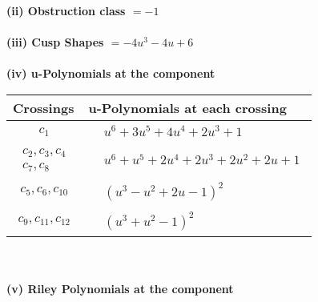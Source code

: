 \documentclass[1p]{elsarticle_modified}
\theoremstyle{definition}
\begin{document}
\flushleft \textbf{(ii) Obstruction class $= -1$}\\~\\
\flushleft \textbf{(iii) Cusp Shapes $= -4 u^3-4 u+6$}\\~\\
\newpage\renewcommand{\arraystretch}{1}
\flushleft \textbf{(iv) u-Polynomials at the component}\newline \\
\begin{tabular}{m{50pt}|m{274pt}}
Crossings & \hspace{64pt}u-Polynomials at each crossing \\
\hline $$\begin{aligned}c_{1}\end{aligned}$$&$\begin{aligned}
&u^6+3 u^5+4 u^4+2 u^3+1
\end{aligned}$\\
\hline $$\begin{aligned}c_{2},c_{3},c_{4}\\c_{7},c_{8}\end{aligned}$$&$\begin{aligned}
&u^6+u^5+2 u^4+2 u^3+2 u^2+2 u+1
\end{aligned}$\\
\hline $$\begin{aligned}c_{5},c_{6},c_{10}\end{aligned}$$&$\begin{aligned}
&(u^3- u^2+2 u-1)^2
\end{aligned}$\\
\hline $$\begin{aligned}c_{9},c_{11},c_{12}\end{aligned}$$&$\begin{aligned}
&(u^3+u^2-1)^2
\end{aligned}$\\
\hline
\end{tabular}\\~\\
\newpage\renewcommand{\arraystretch}{1}
\flushleft \textbf{(v) Riley Polynomials at the component}\newline \\
\end{document}

